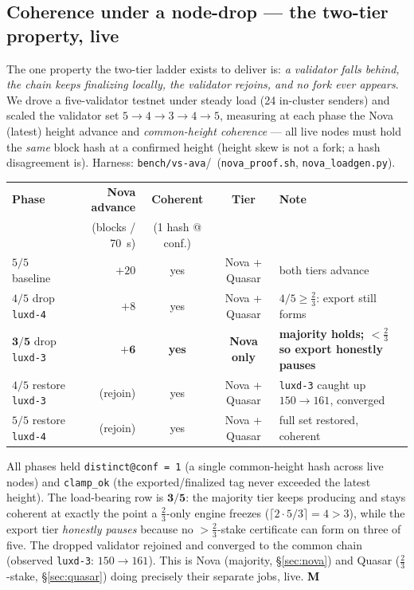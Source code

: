 \documentclass[11pt,a4paper]{article}
\newcommand{\Mnow}{\textbf{\textcolor{black}{M}}}   %
\begin{document}
\subsection{Coherence under a node-drop --- the two-tier property, live}
\label{sec:eval:drop}

The one property the two-tier ladder exists to deliver is: \emph{a validator falls behind, the
chain keeps finalizing locally, the validator rejoins, and no fork ever appears}. We drove a
five-validator testnet under steady load (24 in-cluster senders) and scaled the validator set
\(5 \to 4 \to 3 \to 4 \to 5\), measuring at each phase the Nova (latest) height advance and
\emph{common-height coherence} --- all live nodes must hold the \emph{same} block hash at a
confirmed height (height skew is not a fork; a hash disagreement is). Harness:
\texttt{bench/vs-ava}\slash\ (\texttt{nova\_proof.sh}, \texttt{nova\_loadgen.py}).

\begin{center}
\begin{tabular}{@{}l r c c l@{}}
\toprule
\textbf{Phase} & \textbf{Nova advance} & \textbf{Coherent} & \textbf{Tier} & \textbf{Note} \\
 & (blocks / \SI{70}{s}) & (1 hash @ conf.) & & \\
\midrule
\(5/5\) baseline        & \(+20\) & yes & Nova + Quasar & both tiers advance \\
\(4/5\) drop \texttt{luxd-4} & \(+8\)  & yes & Nova + Quasar & \(4/5 \ge \tfrac{2}{3}\): export still forms \\
\(\mathbf{3/5}\) drop \texttt{luxd-3} & \(\mathbf{+6}\)  & \textbf{yes} & \textbf{Nova only} & \textbf{majority holds; \(<\tfrac{2}{3}\) so export honestly pauses} \\
\(4/5\) restore \texttt{luxd-3} & (rejoin) & yes & Nova + Quasar & \texttt{luxd-3} caught up \(150\!\to\!161\), converged \\
\(5/5\) restore \texttt{luxd-4} & (rejoin) & yes & Nova + Quasar & full set restored, coherent \\
\bottomrule
\end{tabular}
\end{center}

\noindent All phases held \texttt{distinct@conf = 1} (a single common-height hash across live
nodes) and \texttt{clamp\_ok} (the exported/finalized tag never exceeded the latest height).
The load-bearing row is \(\mathbf{3/5}\): the majority tier keeps producing and stays coherent
at exactly the point a \(\tfrac{2}{3}\)-only engine freezes (\(\lceil 2\cdot5/3\rceil=4>3\)),
while the export tier \emph{honestly pauses} because no \(>\tfrac{2}{3}\)-stake certificate can
form on three of five. The dropped validator rejoined and converged to the common chain
(observed \texttt{luxd-3}: \(150\to161\)). This is Nova (majority, \S\ref{sec:nova}) and Quasar
(\(\tfrac{2}{3}\)-stake, \S\ref{sec:quasar}) doing precisely their separate jobs, live. \Mnow
\end{document}
